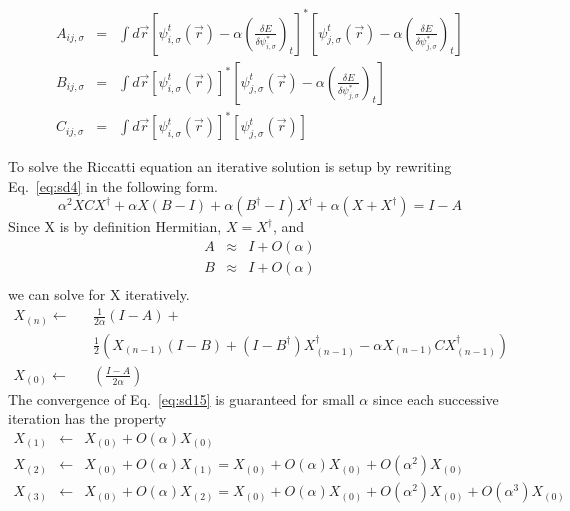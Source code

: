 \begin{eqnarray}
A_{ij,\sigma} &=& \int d\vec{r} 
             \left[\psi_{i,\sigma}^{t}(\vec{r}) 
                   - \alpha 
                     \left( \frac{\delta E}{\delta \psi_{i,\sigma}^{*}} 
                     \right)_t
             \right]^{*} 
             \left[\psi_{j,\sigma}^{t}(\vec{r}) 
                   - \alpha 
                     \left( \frac{\delta E}{\delta \psi_{j,\sigma}^{*}}
                     \right)_t
             \right] \\
B_{ij,\sigma} &=& \int d\vec{r} 
             \left[\psi_{i,\sigma}^{t}(\vec{r}) 
             \right]^{*} 
             \left[\psi_{j,\sigma}^{t}(\vec{r}) 
                   - \alpha 
                     \left( \frac{\delta E}{\delta \psi_{j,\sigma}^{*}}
                     \right)_t
             \right] \\
C_{ij,\sigma} &=& \int d\vec{r} 
             \left[\psi_{i,\sigma}^{t}(\vec{r}) 
             \right]^{*} 
             \left[\psi_{j,\sigma}^{t}(\vec{r}) 
             \right]
\end{eqnarray}

\noindent
To solve the Riccatti equation an iterative solution is setup by rewriting
Eq.~\ref{eq:sd4} in the following form.
\begin{equation}
\alpha^2 XCX^{\dag} + \alpha X(B-I) + \alpha (B^{\dag}-I)X^{\dag} 
 + \alpha(X + X^{\dag}) = I-A
\end{equation}
Since X is by definition Hermitian, $X=X^{\dag}$, and 
\begin{eqnarray}
A  &\approx& I + O(\alpha) \nonumber \\
B  &\approx& I + O(\alpha)  \\
\end{eqnarray}
we can solve for X iteratively.
\begin{eqnarray}
\label{eq:sd15}
X_{(n)} \leftarrow && \frac{1}{2 \alpha}(I-A) + \nonumber \\
                   && \frac{1}{2} \left( X_{(n-1)}(I-B)
                    + (I-B^{\dag})X_{(n-1)}^{\dag}
                    - \alpha X_{(n-1)}CX_{(n-1)}^{\dag} \right)  \\
\label{eq:sd16}
X_{(0)} \leftarrow && \left(\frac{I-A}{2 \alpha}\right)
\end{eqnarray}
The convergence of Eq.~\ref{eq:sd15} is guaranteed for small $\alpha$
since each successive iteration has the property
\begin{eqnarray}
X_{(1)} &\leftarrow& X_{(0)} + O(\alpha)X_{(0)} \nonumber \\
X_{(2)} &\leftarrow& X_{(0)} + O(\alpha) X_{(1)} 
        = X_{(0)} + O(\alpha)X_{(0)} + O(\alpha^2)X_{(0)} \nonumber \\
X_{(3)} &\leftarrow& X_{(0)} + O(\alpha) X_{(2)} 
        = X_{(0)} + O(\alpha)   X_{(0)} 
                  + O(\alpha^2) X_{(0)} 
                  + O(\alpha^3) X_{(0)} \nonumber
\end{eqnarray}


